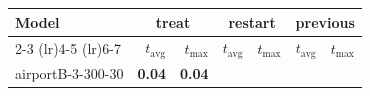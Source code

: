 \begin{tabular}{lrrrrrr}
\toprule
\multirow{2}{*}{Model} & \multicolumn{2}{c}{treat} & \multicolumn{2}{c}{restart} & \multicolumn{2}{c}{previous} \\
    \cmidrule(lr){2-3} \cmidrule(lr){4-5} \cmidrule(lr){6-7}
 & $t_\text{avg}$ & $t_\text{max}$ & $t_\text{avg}$ & $t_\text{max}$ & $t_\text{avg}$ & $t_\text{max}$ \\
\midrule
airportB-3-300-30 & \textbf{0.04} & \textbf{0.04} &  &  &  &  \\
\bottomrule
\end{tabular}
